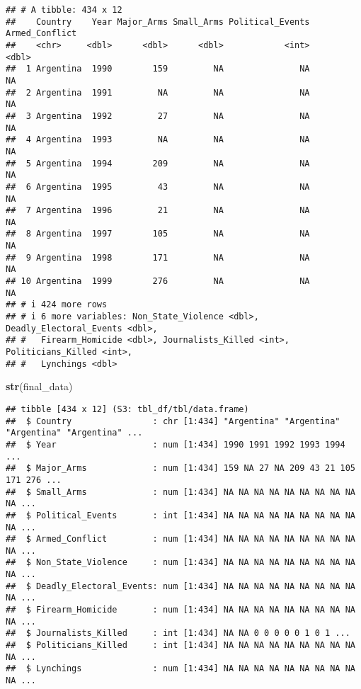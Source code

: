 \documentclass[
  11pt,
]{article}
\newenvironment{Shaded}{\begin{snugshade}}{\end{snugshade}}
\newcommand{\FunctionTok}[1]{\textcolor[rgb]{0.13,0.29,0.53}{\textbf{#1}}}
\newcommand{\NormalTok}[1]{#1}
\begin{document}
\begin{verbatim}
## # A tibble: 434 x 12
##    Country    Year Major_Arms Small_Arms Political_Events Armed_Conflict
##    <chr>     <dbl>      <dbl>      <dbl>            <int>          <dbl>
##  1 Argentina  1990        159         NA               NA             NA
##  2 Argentina  1991         NA         NA               NA             NA
##  3 Argentina  1992         27         NA               NA             NA
##  4 Argentina  1993         NA         NA               NA             NA
##  5 Argentina  1994        209         NA               NA             NA
##  6 Argentina  1995         43         NA               NA             NA
##  7 Argentina  1996         21         NA               NA             NA
##  8 Argentina  1997        105         NA               NA             NA
##  9 Argentina  1998        171         NA               NA             NA
## 10 Argentina  1999        276         NA               NA             NA
## # i 424 more rows
## # i 6 more variables: Non_State_Violence <dbl>, Deadly_Electoral_Events <dbl>,
## #   Firearm_Homicide <dbl>, Journalists_Killed <int>, Politicians_Killed <int>,
## #   Lynchings <dbl>
\end{verbatim}

\begin{Shaded}
\begin{Highlighting}[]
\FunctionTok{str}\NormalTok{(final\_data)}
\end{Highlighting}
\end{Shaded}

\begin{verbatim}
## tibble [434 x 12] (S3: tbl_df/tbl/data.frame)
##  $ Country                : chr [1:434] "Argentina" "Argentina" "Argentina" "Argentina" ...
##  $ Year                   : num [1:434] 1990 1991 1992 1993 1994 ...
##  $ Major_Arms             : num [1:434] 159 NA 27 NA 209 43 21 105 171 276 ...
##  $ Small_Arms             : num [1:434] NA NA NA NA NA NA NA NA NA NA ...
##  $ Political_Events       : int [1:434] NA NA NA NA NA NA NA NA NA NA ...
##  $ Armed_Conflict         : num [1:434] NA NA NA NA NA NA NA NA NA NA ...
##  $ Non_State_Violence     : num [1:434] NA NA NA NA NA NA NA NA NA NA ...
##  $ Deadly_Electoral_Events: num [1:434] NA NA NA NA NA NA NA NA NA NA ...
##  $ Firearm_Homicide       : num [1:434] NA NA NA NA NA NA NA NA NA NA ...
##  $ Journalists_Killed     : int [1:434] NA NA 0 0 0 0 0 1 0 1 ...
##  $ Politicians_Killed     : int [1:434] NA NA NA NA NA NA NA NA NA NA ...
##  $ Lynchings              : num [1:434] NA NA NA NA NA NA NA NA NA NA ...
\end{verbatim}
\end{document}
